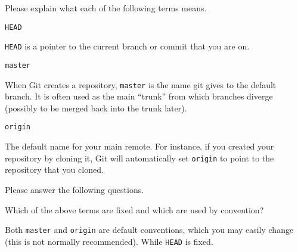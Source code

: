 \documentclass[10pt]{examdesign}
\begin{document}
\begin{shortanswer}[title={Short Answer},
                    rearrange=no,resetcounter=no]

\begin{block}[questions=3]
Please explain what each of the following terms means.

\begin{question}
  \texttt{HEAD}
  \vspace{5mm}
  \begin{answer}
    \texttt{HEAD} is a pointer to the current branch or commit that you are on.
  \end{answer}
\end{question}

\begin{question}
  \texttt{master}
  \vspace{5mm}
  \begin{answer}
    When Git creates a repository, \texttt{master} is the name git gives to the
      default branch.  It is often used as the main ``trunk'' from which
      branches diverge (possibly to be merged back into the trunk later).
  \end{answer}
\end{question}

\begin{question}
  \texttt{origin}
  \vspace{5mm}
  \begin{answer}
    The default name for your main remote.  For instance, if you created
    your repository by cloning it, Git will automatically set \texttt{origin}
    to point to the repository that you cloned.
  \end{answer}
\end{question}
\end{block}

\begin{block}[questions=3]
Please answer the following questions.

\begin{question}
  Which of the above terms are fixed and which are used by convention?
  \vspace{5mm}
  \begin{answer}
    Both \texttt{master} and \texttt{origin} are default conventions, which
    you may easily change (this is not normally recommended).  While
    \texttt{HEAD} is fixed.
  \end{answer}
\end{question}


\end{block}
\end{shortanswer}
\end{document}
